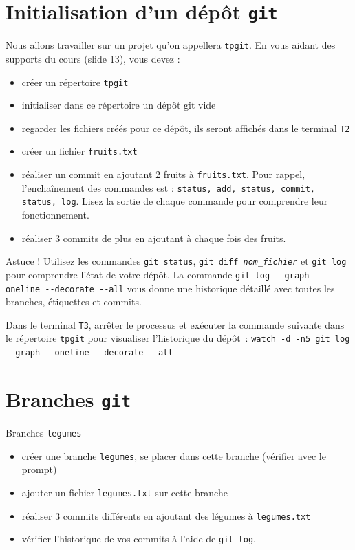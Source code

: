 \documentclass[final, a4paper, openbib, ]{article}
\begin{document}
\section{Initialisation d'un dépôt \texttt{git}}

Nous allons travailler sur un projet qu'on appellera \texttt{tpgit}.
En vous aidant des supports du cours (slide 13), vous devez :
\begin{itemize}
\item créer un répertoire \texttt{tpgit}
\item initialiser dans ce répertoire un dépôt git vide
\item regarder les fichiers créés pour ce dépôt, ils seront affichés dans le terminal \texttt{T2}
\item créer un fichier \texttt{fruits.txt}
\item réaliser un commit en ajoutant 2 fruits à \texttt{fruits.txt}.
Pour rappel, l'enchaînement des commandes est : \texttt{status, add, status, commit, status, log}.
Lisez la sortie de chaque commande pour comprendre leur fonctionnement.
\item réaliser 3 commits de plus en ajoutant à chaque fois des fruits.
\end{itemize}

\begin{alertinfo3}{Astuce !}
Utilisez les commandes \texttt{git status}, \texttt{git diff \textit{nom\_fichier}} et \texttt{git log} pour comprendre l'état de votre dépôt. La commande \texttt{git log -}\texttt{-graph -}\texttt{-oneline -}\texttt{-decorate -}\texttt{-all} vous donne une historique détaillé avec toutes les branches, étiquettes et commits.

\end{alertinfo3}

Dans le terminal \texttt{T3}, arrêter le processus et exécuter la commande suivante dans le répertoire \texttt{tpgit} pour visualiser l'historique du dépôt~: \verb+watch -d -n5 git log --graph --oneline --decorate --all+ 
\section{Branches \texttt{git}}

Branches \texttt{legumes}
\begin{itemize}
\item créer une branche \texttt{legumes}, se placer dans cette branche (vérifier avec le prompt)
\item ajouter un fichier \texttt{legumes.txt} sur cette branche
\item réaliser 3 commits différents en ajoutant des légumes à \texttt{legumes.txt}
\item vérifier l'historique de vos commits à l'aide de \texttt{git log}.
\end{itemize}
\end{document}
